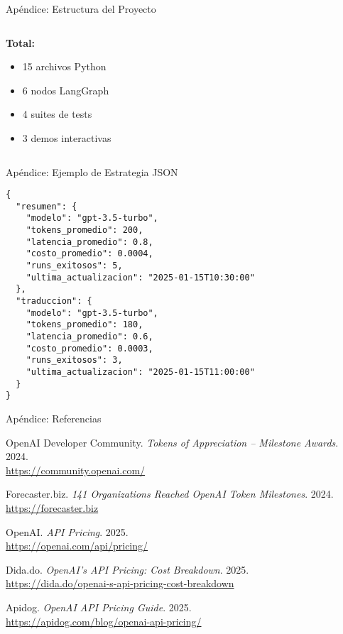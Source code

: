 \documentclass[aspectratio=169,11pt]{beamer}
\begin{document}
\begin{frame}{Apéndice: Estructura del Proyecto}
\begin{columns}[T]
\begin{column}{0.48\textwidth}
\vspace{0.3cm}

\textbf{Total:}
\begin{itemize}
    \item 15 archivos Python
    \item 6 nodos LangGraph
    \item 4 suites de tests
    \item 3 demos interactivas
\end{itemize}
\end{column}
\end{columns}
\end{frame}

\begin{frame}[fragile]{Apéndice: Ejemplo de Estrategia JSON}
\begin{lstlisting}
{
  "resumen": {
    "modelo": "gpt-3.5-turbo",
    "tokens_promedio": 200,
    "latencia_promedio": 0.8,
    "costo_promedio": 0.0004,
    "runs_exitosos": 5,
    "ultima_actualizacion": "2025-01-15T10:30:00"
  },
  "traduccion": {
    "modelo": "gpt-3.5-turbo",
    "tokens_promedio": 180,
    "latencia_promedio": 0.6,
    "costo_promedio": 0.0003,
    "runs_exitosos": 3,
    "ultima_actualizacion": "2025-01-15T11:00:00"
  }
}
\end{lstlisting}
\end{frame}

\begin{frame}{Apéndice: Referencias}
\begin{thebibliography}{99}
OpenAI Developer Community. \textit{Tokens of Appreciation – Milestone Awards}. 2024. \\
\url{https://community.openai.com/}

Forecaster.biz. \textit{141 Organizations Reached OpenAI Token Milestones}. 2024. \\
\url{https://forecaster.biz}

OpenAI. \textit{API Pricing}. 2025. \\
\url{https://openai.com/api/pricing/}

Dida.do. \textit{OpenAI's API Pricing: Cost Breakdown}. 2025. \\
\url{https://dida.do/openai-s-api-pricing-cost-breakdown}

Apidog. \textit{OpenAI API Pricing Guide}. 2025. \\
\url{https://apidog.com/blog/openai-api-pricing/}
\end{thebibliography}
\end{frame}
\end{document}
